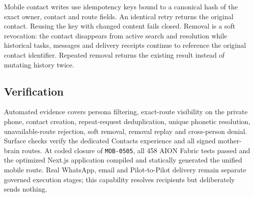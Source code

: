 Mobile contact writes use idempotency keys bound to a canonical hash of the exact owner, contact
and route fields.  An identical retry returns the original contact.  Reusing the key with changed
content fails closed.  Removal is a soft revocation: the contact disappears from active search and
resolution while historical tasks, messages and delivery receipts continue to reference the
original contact identifier.  Repeated removal returns the existing result instead of mutating
history twice.

\subsection{Verification}

Automated evidence covers persona filtering, exact-route visibility on the private phone, contact
creation, repeat-request deduplication, unique phonetic resolution, unavailable-route rejection,
soft removal, removal replay and cross-person denial.  Surface checks verify the dedicated
Contacts experience and all signed mother-brain routes.  At coded closure of \texttt{MOB-0505},
all 458 AION Fabric tests passed and the optimized Next.js application compiled and statically
generated the unified mobile route.  Real WhatsApp, email and Pilot-to-Pilot delivery remain
separate governed execution stages; this capability resolves recipients but deliberately sends
nothing.

